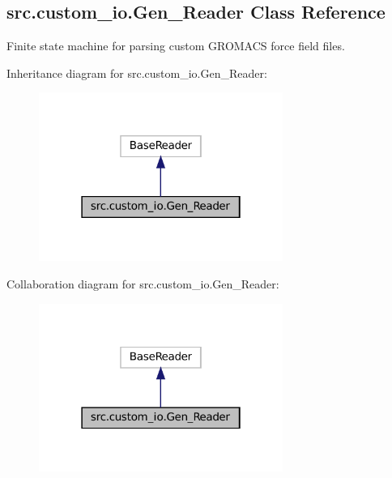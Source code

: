 \hypertarget{classsrc_1_1custom__io_1_1Gen__Reader}{}\subsection{src.\+custom\+\_\+io.\+Gen\+\_\+\+Reader Class Reference}
\label{classsrc_1_1custom__io_1_1Gen__Reader}


Finite state machine for parsing custom G\+R\+O\+M\+A\+CS force field files.  




Inheritance diagram for src.\+custom\+\_\+io.\+Gen\+\_\+\+Reader\+:
\nopagebreak
\begin{figure}[H]
\begin{center}
\leavevmode
\includegraphics[width=226pt]{classsrc_1_1custom__io_1_1Gen__Reader__inherit__graph}
\end{center}
\end{figure}


Collaboration diagram for src.\+custom\+\_\+io.\+Gen\+\_\+\+Reader\+:
\nopagebreak
\begin{figure}[H]
\begin{center}
\leavevmode
\includegraphics[width=226pt]{classsrc_1_1custom__io_1_1Gen__Reader__coll__graph}
\end{center}
\end{figure}
